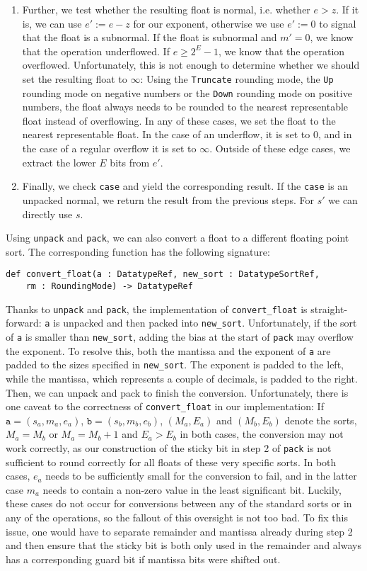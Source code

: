 \documentclass[a4paper,UKenglish,cleveref, autoref, thm-restate]{lipics-v2019}
\begin{document}
\begin{enumerate}
	\item Further, we test whether the resulting float is normal, i.e. whether $e > z$. If it is, we can use $e' := e - z$ for our exponent, otherwise we use $e' := 0$ to signal that the float is a subnormal. If the float is subnormal and $m' = 0$, we know that the operation underflowed. If $e \geq 2^E - 1$, we know that the operation overflowed. Unfortunately, this is not enough to determine whether we should set the resulting float to $\infty$: Using the \verb|Truncate| rounding mode, the \verb|Up| rounding mode on negative numbers or the \verb|Down| rounding mode on positive numbers, the float always needs to be rounded to the nearest representable float instead of overflowing. In any of these cases, we set the float to the nearest representable float. In the case of an underflow, it is set to $0$, and in the case of a regular overflow it is set to $\infty$. Outside of these edge cases, we extract the lower $E$ bits from $e'$.
	\item Finally, we check \verb|case| and yield the corresponding result. If the \verb|case| is an unpacked normal, we return the result from the previous steps. For $s'$ we can directly use $s$.
\end{enumerate}

Using \verb|unpack| and \verb|pack|, we can also convert a float to a different floating point sort. The corresponding function has the following signature:
\begin{lstlisting}
def convert_float(a : DatatypeRef, new_sort : DatatypeSortRef, 
    rm : RoundingMode) -> DatatypeRef
\end{lstlisting}
Thanks to \verb|unpack| and \verb|pack|, the implementation of \verb|convert_float| is straight-forward: \verb|a| is unpacked and then packed into \verb|new_sort|. Unfortunately, if the sort of \verb|a| is smaller than \verb|new_sort|, adding the bias at the start of \verb|pack| may overflow the exponent. To resolve this, both the mantissa and the exponent of \verb|a| are padded to the sizes specified in \verb|new_sort|. The exponent is padded to the left, while the mantissa, which represents a couple of decimals, is padded to the right.
Then, we can unpack and pack to finish the conversion. Unfortunately, there is one caveat to the correctness of \verb|convert_float| in our implementation: If $\texttt{a} = (s_a, m_a, e_a)$, $\texttt{b} = (s_b, m_b, e_b)$, $(M_a, E_a)$ and $(M_b, E_b)$ denote the sorts, $M_a = M_b$ or $M_a = M_b + 1$ and $E_a > E_b$ in both cases, the conversion may not work correctly, as our construction of the sticky bit in step 2 of \verb|pack| is not sufficient to round correctly for all floats of these very specific sorts. In both cases, $e_a$ needs to be sufficiently small for the conversion to fail, and in the latter case $m_a$ needs to contain a non-zero value in the least significant bit. Luckily, these cases do not occur for conversions between any of the standard sorts or in any of the operations, so the fallout of this oversight is not too bad. To fix this issue, one would have to separate remainder and mantissa already during step 2 and then ensure that the sticky bit is both only used in the remainder and always has a corresponding guard bit if mantissa bits were shifted out.
\end{document}
